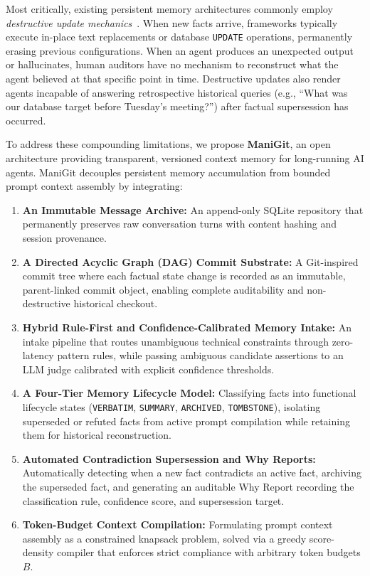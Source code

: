 Most critically, existing persistent memory architectures commonly employ \textit{destructive update mechanics}~\cite{packer2023memgpt,deshmukh2024mem0,zhou2025ltmsecurity}. When new facts arrive, frameworks typically execute in-place text replacements or database \texttt{UPDATE} operations, permanently erasing previous configurations. When an agent produces an unexpected output or hallucinates, human auditors have no mechanism to reconstruct what the agent believed at that specific point in time. Destructive updates also render agents incapable of answering retrospective historical queries (e.g., ``What was our database target before Tuesday's meeting?'') after factual supersession has occurred.

To address these compounding limitations, we propose \textbf{ManiGit}, an open architecture providing transparent, versioned context memory for long-running AI agents. ManiGit decouples persistent memory accumulation from bounded prompt context assembly by integrating:
\begin{enumerate}
    \item \textbf{An Immutable Message Archive:} An append-only SQLite repository that permanently preserves raw conversation turns with content hashing and session provenance.
    \item \textbf{A Directed Acyclic Graph (DAG) Commit Substrate:} A Git-inspired commit tree where each factual state change is recorded as an immutable, parent-linked commit object, enabling complete auditability and non-destructive historical checkout.
    \item \textbf{Hybrid Rule-First and Confidence-Calibrated Memory Intake:} An intake pipeline that routes unambiguous technical constraints through zero-latency pattern rules, while passing ambiguous candidate assertions to an LLM judge calibrated with explicit confidence thresholds.
    \item \textbf{A Four-Tier Memory Lifecycle Model:} Classifying facts into functional lifecycle states (\texttt{VERBATIM}, \texttt{SUMMARY}, \texttt{ARCHIVED}, \texttt{TOMBSTONE}), isolating superseded or refuted facts from active prompt compilation while retaining them for historical reconstruction.
    \item \textbf{Automated Contradiction Supersession and Why Reports:} Automatically detecting when a new fact contradicts an active fact, archiving the superseded fact, and generating an auditable Why Report recording the classification rule, confidence score, and supersession target.
    \item \textbf{Token-Budget Context Compilation:} Formulating prompt context assembly as a constrained knapsack problem, solved via a greedy score-density compiler that enforces strict compliance with arbitrary token budgets $B$.
\end{enumerate}

